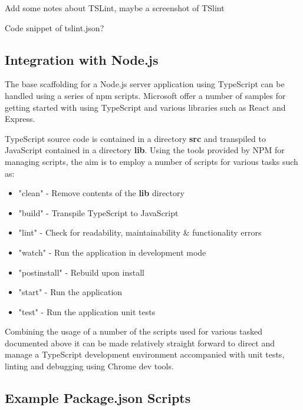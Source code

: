 Add some notes about TSLint, maybe a screenshot of TSlint

Code snippet of tslint.json?

\subsection{Integration with Node.js}
The base scaffolding for a Node.js server application using TypeScript can be handled using a series of npm scripts\cite{npmscripts}. Microsoft offer a number of samples for getting started with using TypeScript and various libraries such as React and Express\cite{typescript}.

TypeScript source code is contained in a directory \textbf{src} and transpiled to JavaScript contained in a directory \textbf{lib}.
Using the tools provided by NPM for managing scripts, the aim is to employ a number of scripts for various tasks such as:

\begin{itemize}
\item{"clean" - Remove contents of the \textbf{lib} directory}
\item{"build" - Transpile TypeScript to JavaScript}
\item{"lint" - Check for readability, maintainability \& functionality errors}
\item{"watch" - Run the application in development mode}
\item{"postinstall" - Rebuild upon install}
\item{"start" - Run the application}
\item{"test" - Run the application unit tests}
\end{itemize}

Combining the usage of a number of the scripts used for various tasked documented above it can be made relatively straight forward to direct and manage a TypeScript development environment accompanied with unit tests, linting and debugging using Chrome dev tools\cite{nodedebug}. 

\subsection*{Example Package.json Scripts }


